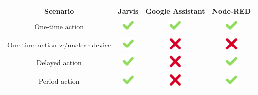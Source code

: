 \documentclass[runningheads]{llncs}
\begin{document}
\begin{table}
    \centering
    \begin{tabular}{ | c | c | c | c |}
    \hline
    Scenario & Jarvis & Google Assistant & Node-RED \\ \hline

    One-time action &
    \includegraphics[width=20pt]{figures/checkmark} &
    \includegraphics[width=20pt]{figures/checkmark} &
    \includegraphics[width=20pt]{figures/checkmark} \\ \hline
    
    One-time action w/unclear device &
    \includegraphics[width=20pt]{figures/checkmark} &
    \includegraphics[width=20pt]{figures/cross} &
    \includegraphics[width=20pt]{figures/cross} \\ \hline
    
    Delayed action &
    \includegraphics[width=20pt]{figures/checkmark} & 
    \includegraphics[width=20pt]{figures/cross} &
    \includegraphics[width=20pt]{figures/checkmark} \\ \hline
    
    Period action &
    \includegraphics[width=20pt]{figures/checkmark} & 
    \includegraphics[width=20pt]{figures/cross} &
    \includegraphics[width=20pt]{figures/checkmark} \\ \hline
    

\end{tabular}
\end{table}
\end{document}

